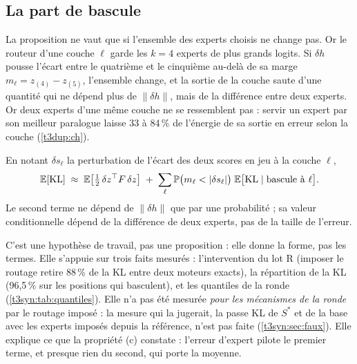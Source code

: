 \subsection{La part de bascule}

La proposition ne vaut que si l'ensemble des experts choisis ne change pas. Or le routeur d'une couche $\ell$ garde les $k = 4$ experts de plus grands logits. Si $\delta h$ pousse l'écart entre le quatrième et le cinquième au-delà de sa marge $m_\ell = z_{(4)} - z_{(5)}$, l'ensemble change, et la sortie de la couche saute d'une quantité qui ne dépend plus de $\|\delta h\|$, mais de la différence entre deux experts. Or deux experts d'une même couche ne se ressemblent pas : servir un expert par son meilleur paralogue laisse 33 à 84\,\% de l'énergie de sa sortie en erreur selon la couche (\cref{t3dup:ch}).

\begin{hypothese}\label{t3syn:hyp:bascule}
En notant $\delta s_\ell$ la perturbation de l'écart des deux scores en jeu à la couche $\ell$,
\[
\mathbb{E}[\mathrm{KL}] \;\approx\; \mathbb{E}\bigl[\tfrac12\,\delta z^{\top}F\,\delta z\bigr] \;+\; \sum_{\ell} \mathbb{P}\bigl(m_\ell < |\delta s_\ell|\bigr)\; \mathbb{E}\bigl[\mathrm{KL} \mid \text{bascule à } \ell\bigr].
\]
Le second terme ne dépend de $\|\delta h\|$ que par une probabilité ; sa valeur conditionnelle dépend de la différence de deux experts, pas de la taille de l'erreur.
\end{hypothese}

C'est une hypothèse de travail, pas une proposition : elle donne la forme, pas les termes. Elle s'appuie sur trois faits mesurés : l'intervention du lot R (imposer le routage retire 88\,\% de la KL entre deux moteurs exacts), la répartition de la KL (96,5\,\% sur les positions qui basculent), et les quantiles de la ronde (\cref{t3syn:tab:quantiles}). Elle n'a pas été mesurée \emph{pour les mécanismes de la ronde} par le routage imposé : la mesure qui la jugerait, la passe KL de $S^{*}$ et de la base avec les experts imposés depuis la référence, n'est pas faite (\cref{t3syn:sec:faux}). Elle explique ce que la propriété (c) constate : l'erreur d'expert pilote le premier terme, et presque rien du second, qui porte la moyenne.

\begin{figure}[tbp]
\centering
\GrapheSynthDeuxParts
{}
\label{fig:t3-synth-deux-parts}
\end{figure}

